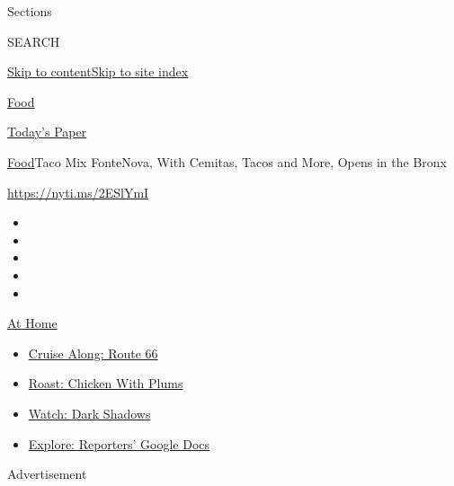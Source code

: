 Sections

SEARCH

\protect\hyperlink{site-content}{Skip to
content}\protect\hyperlink{site-index}{Skip to site index}

\href{https://www.nytimes3xbfgragh.onion/section/food}{Food}

\href{https://myaccount.nytimes3xbfgragh.onion/auth/login?response_type=cookie\&client_id=vi}{}

\href{https://www.nytimes3xbfgragh.onion/section/todayspaper}{Today's
Paper}

\href{/section/food}{Food}\textbar{}Taco Mix FonteNova, With Cemitas,
Tacos and More, Opens in the Bronx

\url{https://nyti.ms/2ESlYmI}

\begin{itemize}
\item
\item
\item
\item
\item
\end{itemize}

\href{https://www.nytimes3xbfgragh.onion/spotlight/at-home?action=click\&pgtype=Article\&state=default\&region=TOP_BANNER\&context=at_home_menu}{At
Home}

\begin{itemize}
\tightlist
\item
  \href{https://www.nytimes3xbfgragh.onion/2020/09/07/travel/route-66.html?action=click\&pgtype=Article\&state=default\&region=TOP_BANNER\&context=at_home_menu}{Cruise
  Along: Route 66}
\item
  \href{https://www.nytimes3xbfgragh.onion/2020/09/04/dining/sheet-pan-chicken.html?action=click\&pgtype=Article\&state=default\&region=TOP_BANNER\&context=at_home_menu}{Roast:
  Chicken With Plums}
\item
  \href{https://www.nytimes3xbfgragh.onion/2020/09/04/arts/television/dark-shadows-stream.html?action=click\&pgtype=Article\&state=default\&region=TOP_BANNER\&context=at_home_menu}{Watch:
  Dark Shadows}
\item
  \href{https://www.nytimes3xbfgragh.onion/interactive/2020/at-home/even-more-reporters-editors-diaries-lists-recommendations.html?action=click\&pgtype=Article\&state=default\&region=TOP_BANNER\&context=at_home_menu}{Explore:
  Reporters' Google Docs}
\end{itemize}

Advertisement

